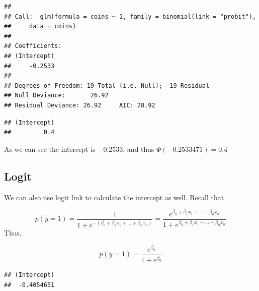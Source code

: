 \documentclass[]{book}
\newenvironment{Shaded}{\begin{snugshade}}{\end{snugshade}}
\newcommand{\DataTypeTok}[1]{\textcolor[rgb]{0.13,0.29,0.53}{#1}}
\newcommand{\DecValTok}[1]{\textcolor[rgb]{0.00,0.00,0.81}{#1}}
\newcommand{\KeywordTok}[1]{\textcolor[rgb]{0.13,0.29,0.53}{\textbf{#1}}}
\newcommand{\NormalTok}[1]{#1}
\newcommand{\OperatorTok}[1]{\textcolor[rgb]{0.81,0.36,0.00}{\textbf{#1}}}
\newcommand{\StringTok}[1]{\textcolor[rgb]{0.31,0.60,0.02}{#1}}
\begin{document}
\begin{verbatim}
## 
## Call:  glm(formula = coins ~ 1, family = binomial(link = "probit"), 
##     data = coins)
## 
## Coefficients:
## (Intercept)  
##     -0.2533  
## 
## Degrees of Freedom: 19 Total (i.e. Null);  19 Residual
## Null Deviance:       26.92 
## Residual Deviance: 26.92     AIC: 28.92
\end{verbatim}

\begin{Shaded}
\end{Shaded}

\begin{verbatim}
## (Intercept) 
##         0.4
\end{verbatim}

As we can see the intercept is \(-0.2533\), and thus \(\Phi(-0.2533471)=0.4\)

\hypertarget{logit-1}{%
\subsection{Logit}\label{logit-1}}

We can also use logit link to calculate the intercept as well. Recall that

\[p(y=1)=\frac{1}{1+e^{-(\beta_0+\beta_1x_1+...+\beta_nx_n)}}=\frac{e^{\beta_0+\beta_1x_1+...+\beta_nx_n}}{1+e^{\beta_0+\beta_1x_1+...+\beta_nx_n}}\]
Thus,

\[p(y=1)=\frac{e^{\beta_0}}{1+e^{\beta_0}}\]

\begin{Shaded}
\end{Shaded}

\begin{verbatim}
## (Intercept) 
##  -0.4054651
\end{verbatim}

\begin{Shaded}
\end{Shaded}
\end{document}
